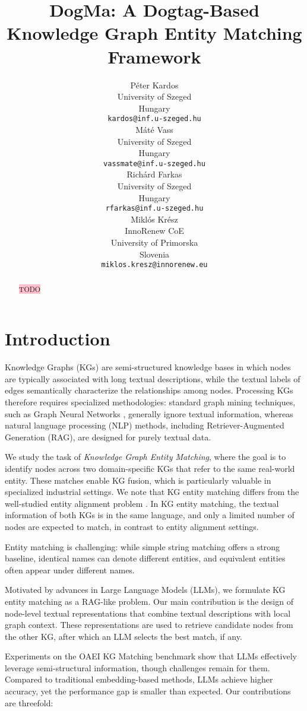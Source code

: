 \documentclass[11pt]{article}
\title{DogMa: A Dogtag-Based Knowledge Graph Entity Matching Framework}
\author{
    Péter Kardos \\
    University of Szeged \\
    Hungary \\
    \texttt{kardos@inf.u-szeged.hu} \\
    \And
    Máté Vass \\
    University of Szeged \\
    Hungary \\
    \texttt{vassmate@inf.u-szeged.hu} \\
    \AND
    Richárd Farkas \\
    University of Szeged \\
    Hungary \\
    \texttt{rfarkas@inf.u-szeged.hu} \\
    \And
    Miklós Krész \\
    InnoRenew CoE \\
    University of Primorska \\
    Slovenia \\
    \texttt{miklos.kresz@innorenew.eu} \\
}
\begin{document}
\maketitle

\begin{abstract}

\colorbox{pink}{TODO}

\end{abstract}

\section{Introduction}

Knowledge Graphs (KGs) are semi-structured knowledge bases in which nodes are typically associated with long textual descriptions, while the textual labels of edges semantically characterize the relationships among nodes. Processing KGs therefore requires specialized methodologies: standard graph mining techniques, such as Graph Neural Networks \cite{}, generally ignore textual information, whereas natural language processing (NLP) methods, including Retriever-Augmented Generation (RAG), are designed for purely textual data.

We study the task of \emph{Knowledge Graph Entity Matching}, where the goal is to identify nodes across two domain-specific KGs that refer to the same real-world entity. These matches enable KG fusion, which is particularly valuable in specialized industrial settings. We note that KG entity matching differs from the well-studied entity alignment problem \cite{}. In KG entity matching, the textual information of both KGs is in the same language, and only a limited number of nodes are expected to match, in contrast to entity alignment settings.

Entity matching is challenging: while simple string matching offers a strong baseline, identical names can denote different entities, and equivalent entities often appear under different names.

Motivated by advances in Large Language Models (LLMs), we formulate KG entity matching as a RAG-like problem. Our main contribution is the design of node-level textual representations that combine textual descriptions with local graph context. These representations are used to retrieve candidate nodes from the other KG, after which an LLM selects the best match, if any.

Experiments on the OAEI KG Matching benchmark \cite{} show that LLMs effectively leverage semi-structural information, though challenges remain for them. Compared to traditional embedding-based methods, LLMs achieve higher accuracy, yet the performance gap is smaller than expected. Our contributions are threefold:
\end{document}
